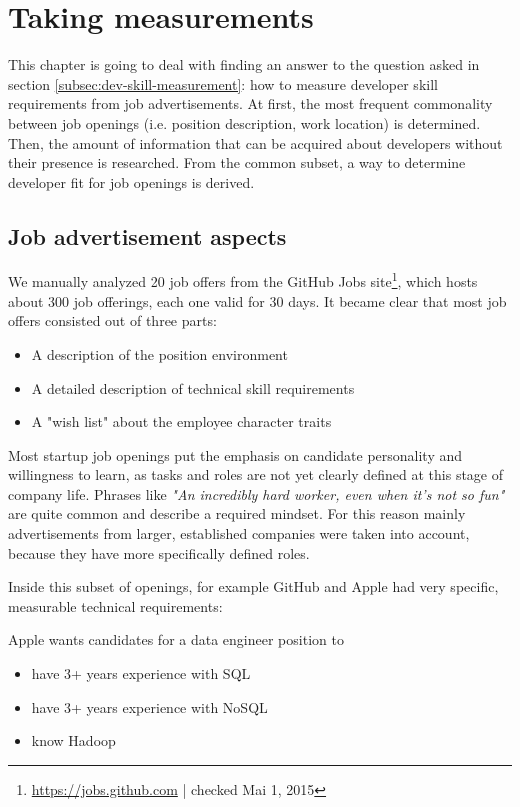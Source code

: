\chapter{Taking measurements}
This chapter is going to deal with finding an answer to the question asked in section \ref{subsec:dev-skill-measurement}: how to measure developer skill requirements from job advertisements.
At first, the most frequent commonality between job openings (i.e.  position description, work location) is determined. Then, the amount of information that can be acquired about developers without their presence is researched. From the common subset, a way to determine developer fit for job openings is derived.

\section{Job advertisement aspects}
We manually analyzed 20 job offers from the GitHub Jobs site\footnote{\url{https://jobs.github.com} | checked Mai 1, 2015}, which hosts about 300 job offerings, each one valid for 30 days. It became clear that most job offers consisted out of three parts:

\begin{itemize}
  \item A description of the position environment
  \item A detailed description of technical skill requirements
  \item A "wish list" about the employee character traits
\end{itemize}

Most startup job openings put the emphasis on candidate personality and willingness to learn, as tasks and roles are not yet clearly defined at this stage of company life. Phrases like \textit{"An incredibly hard worker, even when it's not so fun"} are quite common and describe a required mindset. For this reason mainly advertisements from larger, established  companies were taken into account, because they have more specifically defined roles.

Inside this subset of openings, for example GitHub and Apple had very specific, measurable technical requirements:
\newline

Apple wants candidates for a data engineer position to
\begin{itemize}
    \item have 3+ years experience with SQL
    \item have 3+ years experience with NoSQL
    \item know Hadoop
\end{itemize}

